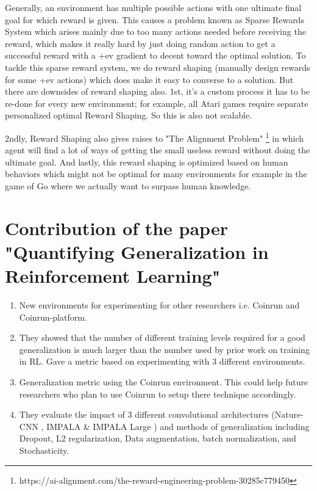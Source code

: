 \documentclass[10pt,twocolumn,letterpaper]{article}
\begin{document}
 Generally, an environment has multiple possible actions with one ultimate final goal for which reward is given. This causes a problem known as Sparse Rewards System \cite{sparse_reward} which arises mainly due to too many actions needed before receiving the reward, which makes it really hard by just doing random action to get a successful reward with a +ev gradient to decent toward the optimal solution. To tackle this sparse reward system, we do reward shaping (manually design rewards for some +ev actions) which does make it easy to converse to a solution. But there are downsides of reward shaping also. 1st, it's a custom process it has to be re-done for every new environment; for example, all Atari games require separate personalized optimal Reward Shaping. So this is also not scalable.
 
 2ndly, Reward Shaping also gives raises to "The Alignment Problem" \footnote{https://ai-alignment.com/the-reward-engineering-problem-30285c779450} in which agent will find a lot of ways of getting the small useless reward without doing the ultimate goal. And lastly, this reward shaping is optimized based on human behaviors which might not be optimal for many environments for example in the game of Go where we actually want to surpass human knowledge.

\section{Contribution of the paper "Quantifying Generalization in Reinforcement Learning" \cite{cobbe_quantifying_2018}}

\begin{enumerate}
    \item New environments for experimenting for other researchers i.e. Coinrun and Coinrun-platform.
    \item They showed that the number of different training levels required for a good generalization is much larger than the number used by prior work on training in RL. Gave a metric based on experimenting with 3 different environments.
    \item Generalization metric using the Coinrun environment. This could help future researchers who plan to use Coinrun to setup there technique accordingly. 
    \item They evaluate the impact of 3 different convolutional architectures (Nature-CNN \cite{mnih_human-level_2015}, IMPALA \cite{IMPALA} & IMPALA Large ) and methods of generalization including Dropout, L2 regularization, Data augmentation, batch normalization, and Stochasticity.
\end{enumerate}
\end{document}
